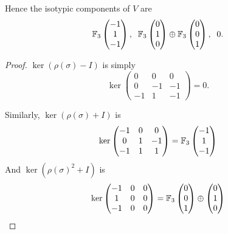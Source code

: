 \documentclass{unswmaths}
\begin{document}
\begin{corollary}
    Hence the isotypic components of $V$ are
    \begin{equation*}
        {\mathbb{F}_3}\begin{pmatrix}
            -1\\1\\-1
        \end{pmatrix},\;\;{\mathbb{F}_3}\begin{pmatrix}0\\1\\0  \end{pmatrix}\oplus{\mathbb{F}_3}\begin{pmatrix} 0\\0\\1\end{pmatrix},\;\;0.
    \end{equation*}
\end{corollary}
\begin{proof}
    $\ker (\rho(\sigma)-I)$ is simply
    \begin{equation*}
        \ker\begin{pmatrix}
            0 & 0 & 0\\
            0 & -1 & -1\\
            -1 & 1 & -1
        \end{pmatrix} = 0.
    \end{equation*}
    
    Similarly, $\ker(\rho(\sigma)+I)$ is
    \begin{equation*}
        \ker\begin{pmatrix}
            -1 & 0 & 0\\
            0 & 1 & -1\\
            -1 & 1 & 1
        \end{pmatrix} = {\mathbb{F}_3}\begin{pmatrix}
                -1 \\1 \\-1
        \end{pmatrix}
    \end{equation*}
    And $\ker(\rho(\sigma)^2+I)$ is
    \begin{equation*}
        \ker\begin{pmatrix}
            -1 & 0 & 0\\
            1 & 0 & 0\\
            -1 & 0 & 0
        \end{pmatrix}
        = {\mathbb{F}_3}\begin{pmatrix}
            0\\0\\1
        \end{pmatrix}\oplus
        \begin{pmatrix}
            0\\1\\0
        \end{pmatrix}       
    \end{equation*}
\end{proof}
\end{document}
